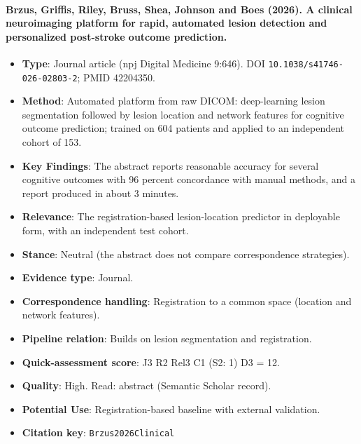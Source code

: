 \documentclass[journal,onecolumn]{IEEEtran}
\begin{document}
\paragraph{Brzus, Griffis, Riley, Bruss, Shea, Johnson and Boes (2026). A clinical neuroimaging platform for rapid, automated lesion detection and personalized post-stroke outcome prediction.~\cite{Brzus2026Clinical}}\mbox{}

\begin{itemize}

\item{} \textbf{Type}: Journal article (npj Digital Medicine 9:646). DOI \nolinkurl{10.1038/s41746-026-02803-2}; PMID 42204350.

\item{} \textbf{Method}: Automated platform from raw DICOM: deep-learning lesion segmentation followed by lesion location and network features for cognitive outcome prediction; trained on 604 patients and applied to an independent cohort of 153.

\item{} \textbf{Key Findings}: The abstract reports reasonable accuracy for several cognitive outcomes with 96 percent concordance with manual methods, and a report produced in about 3 minutes.

\item{} \textbf{Relevance}: The registration-based lesion-location predictor in deployable form, with an independent test cohort.

\item{} \textbf{Stance}: Neutral (the abstract does not compare correspondence strategies).

\item{} \textbf{Evidence type}: Journal.

\item{} \textbf{Correspondence handling}: Registration to a common space (location and network features).

\item{} \textbf{Pipeline relation}: Builds on lesion segmentation and registration.

\item{} \textbf{Quick-assessment score}: J3 R2 Rel3 C1 (S2: 1) D3 = 12.

\item{} \textbf{Quality}: High. Read: abstract (Semantic Scholar record).

\item{} \textbf{Potential Use}: Registration-based baseline with external validation.

\item{} \textbf{Citation key}: \texttt{Brzus2026Clinical}

\end{itemize}
\end{document}
